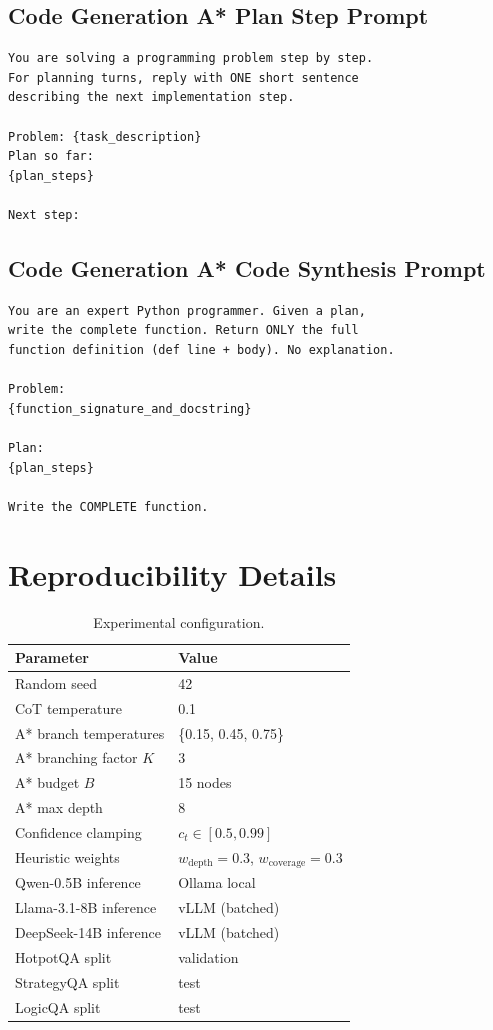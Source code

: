 \documentclass{article}
\begin{document}
\subsection{Code Generation A* Plan Step Prompt}
\begin{verbatim}
You are solving a programming problem step by step.
For planning turns, reply with ONE short sentence
describing the next implementation step.

Problem: {task_description}
Plan so far:
{plan_steps}

Next step:
\end{verbatim}

\subsection{Code Generation A* Code Synthesis Prompt}
\begin{verbatim}
You are an expert Python programmer. Given a plan,
write the complete function. Return ONLY the full
function definition (def line + body). No explanation.

Problem:
{function_signature_and_docstring}

Plan:
{plan_steps}

Write the COMPLETE function.
\end{verbatim}

\section{Reproducibility Details}
\label{app:repro}

\begin{table}[h]
\centering
\caption{Experimental configuration.}
\begin{tabular}{ll}
\toprule
Parameter & Value \\
\midrule
Random seed & 42 \\
CoT temperature & 0.1 \\
A* branch temperatures & \{0.15, 0.45, 0.75\} \\
A* branching factor $K$ & 3 \\
A* budget $B$ & 15 nodes \\
A* max depth & 8 \\
Confidence clamping & $c_t \in [0.5, 0.99]$ \\
Heuristic weights & $w_\text{depth}=0.3$, $w_\text{coverage}=0.3$ \\
\midrule
Qwen-0.5B inference & Ollama local \\
Llama-3.1-8B inference & vLLM (batched) \\
DeepSeek-14B inference & vLLM (batched) \\
HotpotQA split & validation \\
StrategyQA split & test \\
LogicQA split & test \\
\bottomrule
\end{tabular}
\end{table}
\end{document}
